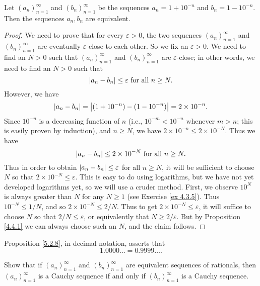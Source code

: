 \begin{proposition}\label{5.2.8}
    Let \((a_n)_{n = 1}^{\infty}\) and \((b_n)_{n = 1}^{\infty}\) be the sequences \(a_n = 1 + 10^{-n}\) and \(b_n = 1 - 10^{-n}\).
    Then the sequences \(a_n, b_n\) are equivalent.
\end{proposition}

\begin{proof}
    We need to prove that for every \(\varepsilon > 0\), the two sequences \((a_n)_{n = 1}^{\infty}\) and \((b_n)_{n = 1}^{\infty}\) are eventually \(\varepsilon\)-close to each other.
    So we fix an \(\varepsilon > 0\).
    We need to find an \(N > 0\) such that \((a_n)_{n = 1}^{\infty}\) and \((b_n)_{n = 1}^{\infty}\) are \(\varepsilon\)-close;
    in other words, we need to find an \(N > 0\) such that
    \[
        \left\lvert a_n - b_n\right\rvert \leq \varepsilon \text{ for all } n \geq N.
    \]
    However, we have
    \[
        \left\lvert a_n - b_n\right\rvert = \left\lvert(1 + 10^{-n}) - (1 - 10^{-n})\right\rvert = 2 \times 10^{-n}.
    \]
    Since \(10^{-n}\) is a decreasing function of \(n\) (i.e., \(10^{-m} < 10^{-n}\) whenever \(m > n\);
    this is easily proven by induction), and \(n \geq N\), we have \(2 \times 10^{-n} \leq 2 \times 10^{-N}\).
    Thus we have
    \[
        \left\lvert a_n - b_n\right\rvert \leq 2 \times 10^{-N} \text{ for all } n \geq N.
    \]
    Thus in order to obtain \(\left\lvert a_n - b_n\right\rvert \leq \varepsilon\) for all \(n \geq N\), it will be sufficient to choose \(N\) so that \(2 \times 10^{-N} \leq \varepsilon\).
    This is easy to do using logarithms, but we have not yet developed logarithms yet, so we will use a cruder method.
    First, we observe \(10^N\) is always greater than \(N\) for any \(N \geq 1\) (see Exercise \ref{ex 4.3.5}).
    Thus \(10^{-N} \leq 1 / N\), and so \(2 \times 10^{-N} \leq 2 / N\).
    Thus to get \(2 \times 10^{-N} \leq \varepsilon\), it will suffice to choose \(N\) so that \(2 / N \leq \varepsilon\), or equivalently that \(N \geq 2 / \varepsilon\).
    But by Proposition \ref{4.4.1} we can always choose such an \(N\), and the claim follows.
\end{proof}

\begin{remark}\label{5.2.9}
    Proposition \ref{5.2.8}, in decimal notation, asserts that
    \[
        1.0000 \dots = 0.9999 \dots.
    \]
\end{remark}

\exercisesection

\begin{exercise}\label{ex 5.2.1}
    Show that if \((a_n)_{n = 1}^{\infty}\) and \((b_n)_{n = 1}^{\infty}\) are equivalent sequences of rationals, then \((a_n)_{n = 1}^{\infty}\) is a Cauchy sequence if and only if \((b_n)_{n = 1}^{\infty}\) is a Cauchy sequence.
\end{exercise}

